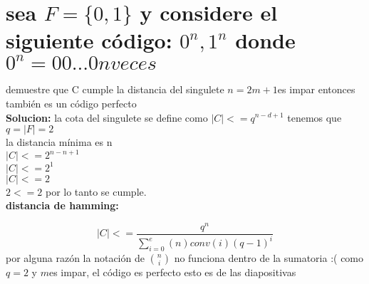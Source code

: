 \documentclass[10pt,a4paper]{article} %
\begin{document}
        \section{sea $F = \{0,1\} $ y considere el siguiente código: ${0 ^{n}  ,
        1 ^{n}  }$ donde $0 ^{n}  = 00...0 n veces$ }
        demuestre que C cumple la distancia del singulete
        $n = 2m+1 $es
        impar entonces también es un código perfecto
        \\
        \textbf{Solucion:}
        la cota del singulete se define como $|C| <= q ^{n-d+1} $
        tenemos que $q= |F| = 2$
        \\
        la distancia mínima es n
        \\
        $|C| <= 2 ^{n-n+1} $
        \\
        $|C| <= 2 ^{1} $
        \\
        $|C| <= 2  $
        \\
        $2 <= 2  $ por lo tanto se cumple.
        \\
        \textbf{distancia de hamming:}

        \begin{equation}
            |C| <= \frac{q ^{n} }{ \sum_{i=0}^{e}  (n)conv(i)  (q-1) ^{i}        }
        \end{equation}
        \color{red} por alguna razón la notación de ${n}\choose{i}$ no funciona
        dentro de la sumatoria :( \color{black}
        como $q = 2$ y $m$es impar, el código es perfecto \color{blue} esto es de las diapositivas \color{black}
\end{document}
